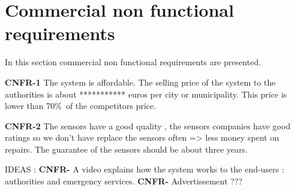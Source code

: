 \section{Commercial non functional requirements}
 In this section commercial non functional requirements are presented.
 
\textbf{CNFR-1} The system is affordable.
The selling price of the system to the authorities is about *********** euros per city or municipality. This price is lower than 70\%\ of the competitors price. %


\textbf{CNFR-2} The sensors have a good quality , the sensors companies have good ratings so we don't have replace the sensors often => less money spent on repairs. The guarantee of the sensors should be about three years.

IDEAS :
\textbf{CNFR-} A video explains how the system works to the end-users : authorities and emergency services.
\textbf{CNFR-} Advertissement ???